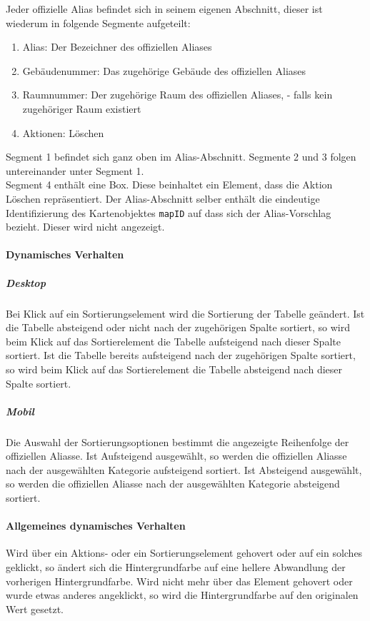 Jeder offizielle Alias befindet sich in seinem eigenen Abschnitt, dieser ist wiederum in folgende Segmente aufgeteilt:

\begin{enumerate}
    \item Alias: Der Bezeichner des offiziellen Aliases
    \item Gebäudenummer: Das zugehörige Gebäude des offiziellen Aliases
    \item Raumnummer: Der zugehörige Raum des offiziellen Aliases, \dq - \dq{} falls kein zugehöriger Raum existiert
    \item Aktionen: Löschen
\end{enumerate}

Segment 1 befindet sich ganz oben im Alias-Abschnitt. Segmente 2 und 3 folgen untereinander unter Segment 1. \\
Segment 4 enthält eine Box. Diese beinhaltet ein Element, dass die Aktion \dq Löschen \dq{} repräsentiert.
Der Alias-Abschnitt selber enthält die eindeutige Identifizierung des Kartenobjektes \verb#mapID# auf dass sich der Alias-Vorschlag bezieht. Dieser wird nicht angezeigt.

\paragraph*{Dynamisches Verhalten}
\subparagraph*{Desktop}
Bei Klick auf ein Sortierungselement wird die Sortierung der Tabelle geändert.
Ist die Tabelle absteigend oder nicht nach der zugehörigen Spalte sortiert, so wird beim Klick auf das Sortierelement die Tabelle aufsteigend nach dieser Spalte sortiert.
Ist die Tabelle bereits aufsteigend nach der zugehörigen Spalte sortiert, so wird beim Klick auf das Sortierelement die Tabelle absteigend nach dieser Spalte sortiert.

\subparagraph*{Mobil}
Die Auswahl der Sortierungsoptionen bestimmt die angezeigte Reihenfolge der offiziellen Aliasse.
Ist \dq Aufsteigend \dq{} ausgewählt, so werden die offiziellen Aliasse nach der ausgewählten Kategorie aufsteigend sortiert.
Ist \dq Absteigend \dq{} ausgewählt, so werden die offiziellen Aliasse nach der ausgewählten Kategorie absteigend sortiert.

\paragraph*{Allgemeines dynamisches Verhalten}
Wird über ein Aktions- oder ein Sortierungselement gehovert oder auf ein solches geklickt, so ändert sich die Hintergrundfarbe auf eine hellere Abwandlung der vorherigen Hintergrundfarbe.
Wird nicht mehr über das Element gehovert oder wurde etwas anderes angeklickt, so wird die Hintergrundfarbe auf den originalen Wert gesetzt.

